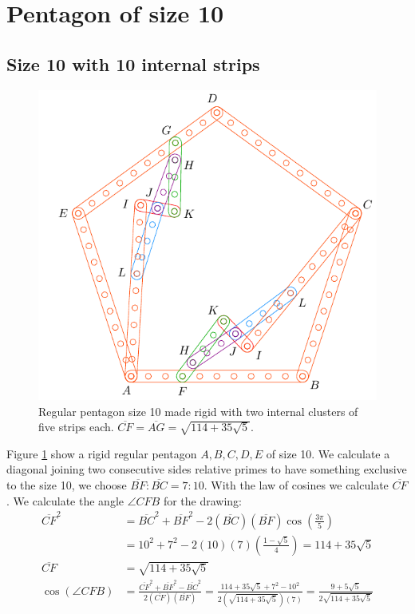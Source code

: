 \documentclass[11pt]{article}
\begin{document}

\section{Pentagon of size 10}

\subsection{Size 10 with 10 internal strips}

\begin{figure}[H]
 \centering
 \includegraphics[scale=0.9]{10/penta10a}
 \caption{Regular pentagon size 10 made rigid with two internal clusters of five strips each. $\overline{CF} = \overline{AG} = \sqrt{114 + 35\sqrt5}$.}
 \label{fig:penta10a}
\end{figure}

Figure \ref{fig:penta10a} show a rigid regular pentagon $A,B,C,D,E$ of size 10. We calculate a diagonal joining two consecutive sides relative primes to have something exclusive to the size 10, we choose $\overline{BF}:\overline{BC} = 7:10$. With the law of cosines we calculate $\overline{CF}$.
We calculate the angle $\angle{CFB}$ for the drawing:
\begin{align}
\overline{CF}^2 &= \overline{BC}^2 + \overline{BF}^2
 - 2(\overline{BC})(\overline{BF})\cos\left(\frac{3\pi}5\right) \nonumber\\
 &= 10^2 + 7^2 - 2(10)(7)\left(\frac{1-\sqrt5}4\right) = 114 + 35\sqrt5 \nonumber\\
\overline{CF} &= \sqrt{114 + 35\sqrt5} \\
\cos(\angle{CFB}) &= \frac{\overline{CF}^2 + \overline{BF}^2 - \overline{BC}^2}
 {2(\overline{CF})(\overline{BF})}%
 = \frac{114+35\sqrt5 + 7^2 - 10^2}{2(\sqrt{114 + 35\sqrt5})(7)}
  = \frac{9+5\sqrt5}{2\sqrt{114+35\sqrt5}}
\end{align}
\end{document}
